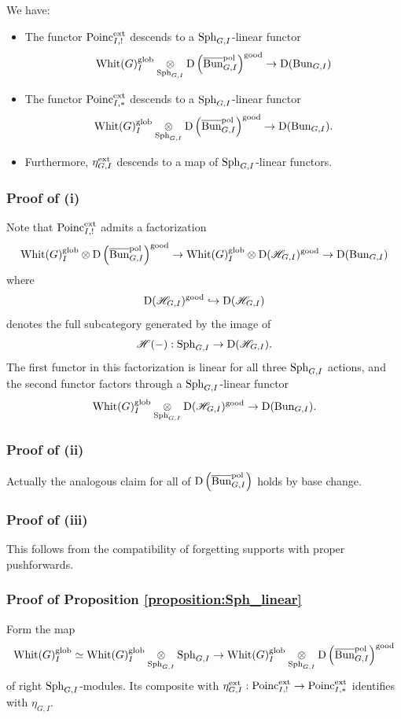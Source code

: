 \begin{proposition}
We have:
\begin{itemize}
    \item[(i)] The functor $\mathrm{Poinc}_{I,!}^{\mathrm{ext}}$ descends to a $\mathrm{Sph}_{G,I}$-linear functor
        \[\mathrm{Whit}(G)_I^{\mathrm{glob}} \underset{\mathrm{Sph}_{G,I}}{\otimes} \mathrm{D}\left(\overline{\mathrm{Bun}}_{G,I}^{\mathrm{pol}} \right)^{\mathrm{good}} \to \mathrm{D}(\mathrm{Bun}_{G,I})\]
    \item[(ii)] The functor $\mathrm{Poinc}_{I,*}^{\mathrm{ext}}$ descends to a $\mathrm{Sph}_{G,I}$-linear functor
      \[\mathrm{Whit}(G)_I^{\mathrm{glob}} \underset{\mathrm{Sph}_{G,I}}{\otimes} \mathrm{D}\left(\overline{\mathrm{Bun}}_{G,I}^{\mathrm{pol}} \right)^{\mathrm{good}} \to \mathrm{D}(\mathrm{Bun}_{G,I}).\]
    \item[(iii)] Furthermore, $\eta_{G,I}^{\mathrm{ext}}$ descends to a map of $\mathrm{Sph}_{G,I}$-linear functors.
\end{itemize}
\end{proposition}

\subsubsection{Proof of (i)} Note that $\mathrm{Poinc}_{I,!}^{\mathrm{ext}}$ admits a factorization
\[
    \mathrm{Whit}(G)_I^{\mathrm{glob}} \otimes \mathrm{D}\left( \overline{\mathrm{Bun}}_{G,I}^{\mathrm{pol}} \right)^{\mathrm{good}}
    \to \mathrm{Whit}(G)_I^{\mathrm{glob}} \otimes \mathrm{D}(\mathscr{H}_{G,I})^{\mathrm{good}}
    \to \mathrm{D}(\mathrm{Bun}_{G,I})
\]
where 
    \[\mathrm{D}(\mathscr{H}_{G,I})^{\mathrm{good}} \hookrightarrow \mathrm{D}(\mathscr{H}_{G,I})\]
denotes the full subcategory generated by the image of
    \[\mathscr{H}(-) : \mathrm{Sph}_{G,I} \to \mathrm{D}(\mathscr{H}_{G,I}).\]
The first functor in this factorization is linear for all three $\mathrm{Sph}_{G,I}$ actions, and the second functor factors through a $\mathrm{Sph}_{G,I}$-linear functor
\[
    \mathrm{Whit}(G)_I^{\mathrm{glob}} \underset{\mathrm{Sph}_{G,I}}{\otimes} \mathrm{D}(\mathscr{H}_{G,I})^{\mathrm{good}}
    \to \mathrm{D}(\mathrm{Bun}_{G,I}).
\]

\subsubsection{Proof of (ii)} Actually the analogous claim for all of $\mathrm{D}\left(\overline{\mathrm{Bun}}_{G,I}^{\mathrm{pol}} \right)$ holds by base change.

\subsubsection{Proof of (iii)} This follows from the compatibility of forgetting supports with proper pushforwards.

\subsubsection{Proof of Proposition \ref{proposition:Sph_linear}} Form the map
\[
    \mathrm{Whit}(G)_I^{\mathrm{glob}} \simeq \mathrm{Whit}(G)_I^{\mathrm{glob}} \underset{\mathrm{Sph}_{G,I}}{\otimes} \mathrm{Sph}_{G,I} 
    \to \mathrm{Whit}(G)_I^{\mathrm{glob}} \underset{\mathrm{Sph}_{G,I}}{\otimes} \mathrm{D}\left(\overline{\mathrm{Bun}}_{G,I}^{\mathrm{pol}} \right)^{\mathrm{good}}
\]
of right $\mathrm{Sph}_{G,I}$-modules. Its composite with $\eta_{G,I}^{\mathrm{ext}} : \mathrm{Poinc}_{I,!}^{\mathrm{ext}} \to \mathrm{Poinc}_{I,*}^{\mathrm{ext}}$ identifies with $\eta_{G,I}$.

